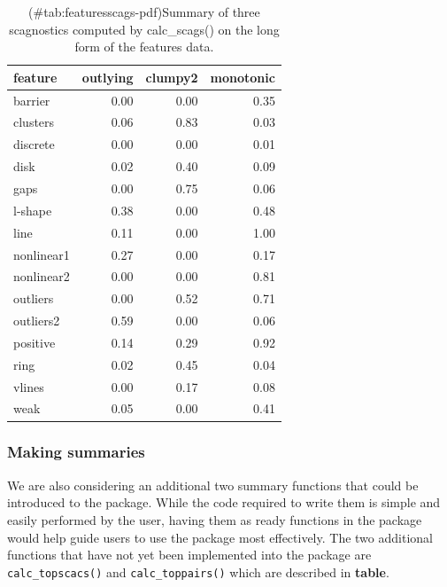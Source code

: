 \begin{Schunk}
\begin{table}

\caption{(\#tab:featuresscags-pdf)Summary of three scagnostics computed by calc\_scags() on the long form of the features data.}
\centering
\begin{tabular}[t]{>{\raggedright\arraybackslash}p{3cm}rrr}
\toprule
feature & outlying & clumpy2 & monotonic\\
\midrule
barrier & 0.00 & 0.00 & 0.35\\
clusters & 0.06 & 0.83 & 0.03\\
discrete & 0.00 & 0.00 & 0.01\\
disk & 0.02 & 0.40 & 0.09\\
gaps & 0.00 & 0.75 & 0.06\\
\addlinespace
l-shape & 0.38 & 0.00 & 0.48\\
line & 0.11 & 0.00 & 1.00\\
nonlinear1 & 0.27 & 0.00 & 0.17\\
nonlinear2 & 0.00 & 0.00 & 0.81\\
outliers & 0.00 & 0.52 & 0.71\\
\addlinespace
outliers2 & 0.59 & 0.00 & 0.06\\
positive & 0.14 & 0.29 & 0.92\\
ring & 0.02 & 0.45 & 0.04\\
vlines & 0.00 & 0.17 & 0.08\\
weak & 0.05 & 0.00 & 0.41\\
\bottomrule
\end{tabular}
\end{table}

\end{Schunk}

\hypertarget{making-summaries}{%
\subsubsection{Making summaries}\label{making-summaries}}

We are also considering an additional two summary functions that could
be introduced to the package. While the code required to write them is
simple and easily performed by the user, having them as ready functions
in the package would help guide users to use the package most
effectively. The two additional functions that have not yet been
implemented into the package are \texttt{calc\_topscacs()} and
\texttt{calc\_toppairs()} which are described in \textbf{table}.

